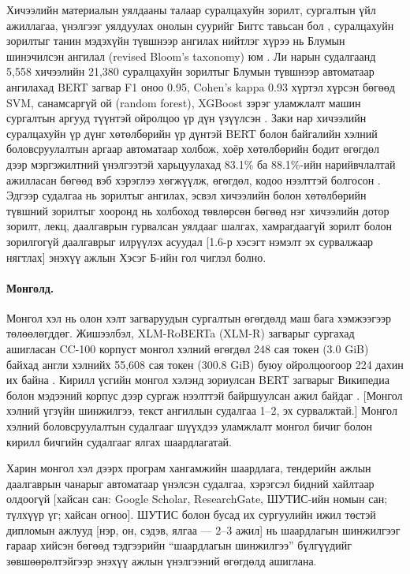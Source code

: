Хичээлийн материалын уялдааны талаар суралцахуйн зорилт, сургалтын үйл ажиллагаа, үнэлгээг уялдуулах онолын суурийг Биггс тавьсан бол \cite{biggs1996}, суралцахуйн зорилтыг танин мэдэхүйн түвшнээр ангилах нийтлэг хүрээ нь Блумын шинэчилсэн ангилал (revised Bloom's taxonomy) юм \cite{anderson2001}. Ли нарын судалгаанд 5,558 хичээлийн 21,380 суралцахуйн зорилтыг Блумын түвшнээр автоматаар ангилахад BERT загвар F1 оноо 0.95, Cohen's kappa 0.93 хүртэл хүрсэн бөгөөд SVM, санамсаргүй ой (random forest), XGBoost зэрэг уламжлалт машин сургалтын аргууд түүнтэй ойролцоо үр дүн үзүүлсэн \cite{li2022bloom}. Заки нар хичээлийн суралцахуйн үр дүнг хөтөлбөрийн үр дүнтэй BERT болон байгалийн хэлний боловсруулалтын аргаар автоматаар холбож, хоёр хөтөлбөрийн бодит өгөгдөл дээр мэргэжилтний үнэлгээтэй харьцуулахад 83.1\% ба 88.1\%-ийн нарийвчлалтай ажилласан бөгөөд вэб хэрэглээ хөгжүүлж, өгөгдөл, кодоо нээлттэй болгосон \cite{zaki2023}. Эдгээр судалгаа нь зорилтыг ангилах, эсвэл хичээлийн болон хөтөлбөрийн түвшний зорилтыг хооронд нь холбоход төвлөрсөн бөгөөд нэг хичээлийн дотор зорилт, лекц, даалгаврын гурвалсан уялдааг шалгах, хамрагдаагүй зорилт болон зорилгогүй даалгаврыг илрүүлэх асуудал [1.6-р хэсэгт нэмэлт эх сурвалжаар нягтлах] энэхүү ажлын Хэсэг Б-ийн гол чиглэл болно.

\paragraph{Монголд.}
Монгол хэл нь олон хэлт загваруудын сургалтын өгөгдөлд маш бага хэмжээгээр төлөөлөгддөг. Жишээлбэл, XLM-RoBERTa (XLM-R) загварыг сургахад ашигласан CC-100 корпуст монгол хэлний өгөгдөл 248 сая токен (3.0 GiB) байхад англи хэлнийх 55,608 сая токен (300.8 GiB) буюу ойролцоогоор 224 дахин их байна \cite{conneau2020}. Кирилл үсгийн монгол хэлэнд зориулсан BERT загварыг Википедиа болон мэдээний корпус дээр сургаж нээлттэй байршуулсан ажил байдаг \cite{mongolianbert}. [Монгол хэлний үгзүйн шинжилгээ, текст ангиллын судалгаа 1--2, эх сурвалжтай.] Монгол хэлний боловсруулалтын судалгааг шүүхдээ уламжлалт монгол бичиг болон кирилл бичгийн судалгааг ялгах шаардлагатай.

Харин монгол хэл дээрх програм хангамжийн шаардлага, тендерийн ажлын даалгаврын чанарыг автоматаар үнэлсэн судалгаа, хэрэгсэл бидний хайлтаар олдоогүй [хайсан сан: Google Scholar, ResearchGate, ШУТИС-ийн номын сан; түлхүүр үг; хайсан огноо]. ШУТИС болон бусад их сургуулийн ижил төстэй дипломын ажлууд [нэр, он, сэдэв, ялгаа — 2--3 ажил] нь шаардлагын шинжилгээг гараар хийсэн бөгөөд тэдгээрийн \enquote{шаардлагын шинжилгээ} бүлгүүдийг зөвшөөрөлтэйгээр энэхүү ажлын үнэлгээний өгөгдөлд ашиглана.

